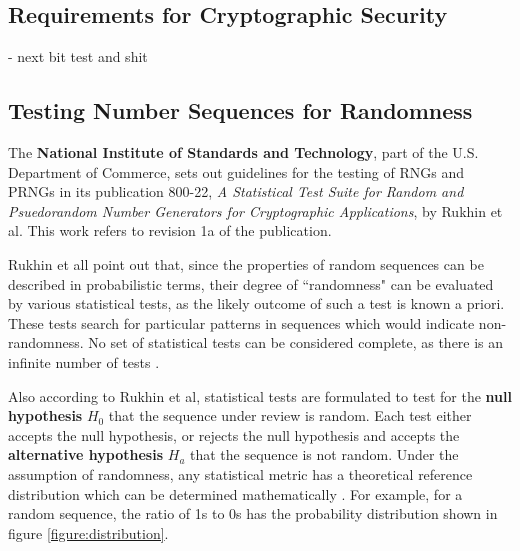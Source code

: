 \documentclass[12pt, titlepage]{report}
\theoremstyle{definition}
\begin{document}
\subsection{Requirements for Cryptographic Security}\label{subsection:crypto_requirements}
- next bit test and shit




\subsection{Testing Number Sequences for Randomness}\label{subsection:testing_prngs}
The \textbf{National Institute of Standards and Technology}, part of the U.S. Department of Commerce, sets out guidelines for the testing of RNGs and PRNGs in its publication 800-22, \textit{A Statistical Test Suite for Random and Psuedorandom Number Generators for Cryptographic Applications}, by Rukhin et al. This work refers to revision 1a of the publication.

Rukhin et all point out that, since the properties of random sequences can be described in probabilistic terms, their degree of ``randomness" can be evaluated by various statistical tests, as the likely outcome of such a test is known a priori. These tests search for particular patterns in sequences which would indicate non-randomness. No set of statistical tests can be considered complete, as there is an infinite number of tests \cite[p. 1-2]{rukhin2001statistical}.

Also according to Rukhin et al, statistical tests are formulated to test for the \textbf{null hypothesis} $H_0$ that the sequence under review is random. Each test either accepts the null hypothesis, or rejects the null hypothesis and accepts the \textbf{alternative hypothesis} $H_a$ that the sequence is not random. Under the assumption of randomness, any statistical metric has a theoretical reference distribution which can be determined mathematically \cite[p. 1.3]{rukhin2001statistical}. For example, for a random sequence, the ratio of 1s to 0s has the probability distribution shown in figure \ref{figure:distribution}.
\end{document}
